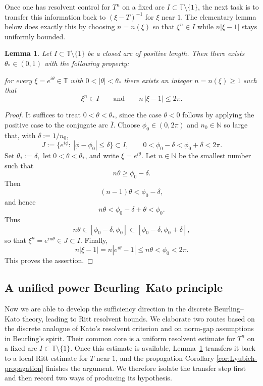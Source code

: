 \documentclass[11pt]{amsart}
\numberwithin{equation}{section}
\newtheorem{lemma}[theorem]{Lemma}
\theoremstyle{definition}
\theoremstyle{plain}
\def\N{\mathbb{N}}
\def\T{\mathbb{T}}
\begin{document}
Once one has resolvent control for $T^n$ on a fixed arc
$I\subset\T\setminus\{1\}$, the next task is to transfer this information back to
$(\xi -T)^{-1}$ for $\xi$ near $1$. The elementary lemma below does exactly this by
choosing $n=n(\xi)$ so that $\xi^n\in I$ while $n|\xi-1|$ stays uniformly
bounded.

\begin{lemma}
\label{lem:hitting-arc}
Let $I\subset\T\setminus \{1\}$ be a closed arc of positive length.
Then there exists $\theta_*\in(0,1)$ with the following property:

for every $\xi=e^{i\theta}\in\T$ with $0<|\theta|<\theta_*$ there exists an integer
$n=n(\xi)\ge 1$ such that
\[
\xi^n\in I
\qquad\text{and}\qquad
n\,|\xi-1|\le 2\pi .
\]
\end{lemma}

\begin{proof}
It suffices to treat $0<\theta<\theta_*$, since the case $\theta<0$ follows by applying the positive case to the conjugate arc $\overline I$.
Choose $\phi_0\in(0,2\pi)$ and $n_0\in\N$ so large that, with $\delta:=1/n_0$,
\[
        J:=\{e^{i\phi}:\ |\phi-\phi_0|\le \delta\}\subset I,
        \qquad
        0<\phi_0-\delta<\phi_0+\delta<2\pi .
\]
Set $\theta_*:=\delta,$
let $0<\theta<\theta_*$, and write $\xi=e^{i\theta}$.  
Let $n\in \mathbb N$ be the smallest number such that
\[
        n\theta\ge \phi_0-\delta .
\]
Then
\[
        (n-1)\theta<\phi_0-\delta,
\]
and hence
\[
        n\theta<\phi_0-\delta+\theta<\phi_0 .
\]
Thus
\[
        n\theta\in[\phi_0-\delta,\phi_0]\subset[\phi_0-\delta,\phi_0+\delta],
\]
so that $\xi^n=e^{in\theta}\in J\subset I$. Finally,
\[
        n|\xi-1|=n|e^{i\theta}-1|\le n\theta<\phi_0<2\pi .
\]
This proves the assertion.
\end{proof}



\subsection{A unified power Beurling--Kato principle}\label{subsec:power-KB}

Now we are able to develop the sufficiency direction in the discrete Beurling--Kato theory,
leading to Ritt resolvent bounds.
We elaborate two routes 
based on the discrete analogue of Kato's resolvent criterion
and on norm-gap assumptions in Beurling's spirit.
Their common core is a uniform resolvent estimate for \(T^n\) on a fixed
arc \(I\subset\mathbb T\setminus\{1\}\).
Once this estimate is available, Lemma~\ref{lem:hitting-arc} transfers it  back to a local
Ritt estimate for $T$ near $1$, and the propagation Corollary \ref{cor:Lyubich-propagation} finishes the argument.
We therefore isolate the transfer step first and then record two ways of producing
its hypothesis.
\end{document}
